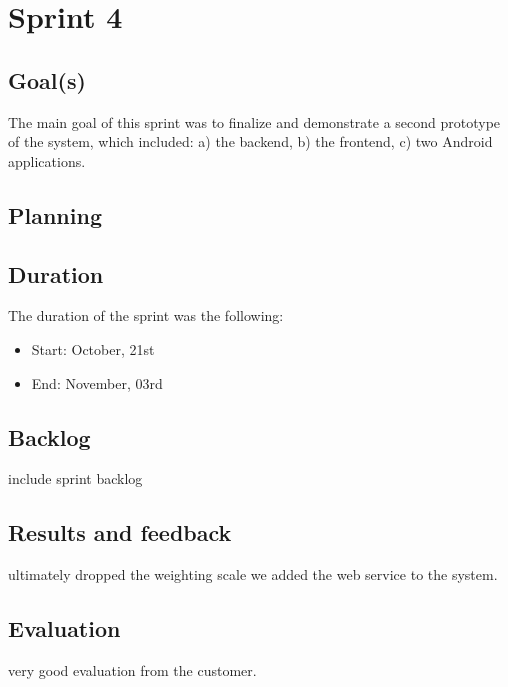 
\chapter{Sprint 4}
\label{Sprint0}

\section{Goal(s)}
The main goal of this sprint was to finalize and demonstrate a second prototype of the system,
which included: a) the backend, b) the frontend, c) two Android applications.

\section{Planning}


\section{Duration}
The duration of the sprint was the following:
\begin{itemize}
\item Start: October, 21st
\item End: November, 03rd
\end{itemize}

\section{Backlog}
include sprint backlog

\section{Results and feedback}

ultimately dropped the weighting scale
we added the web service to the system.

\section{Evaluation}

very good evaluation from the customer.